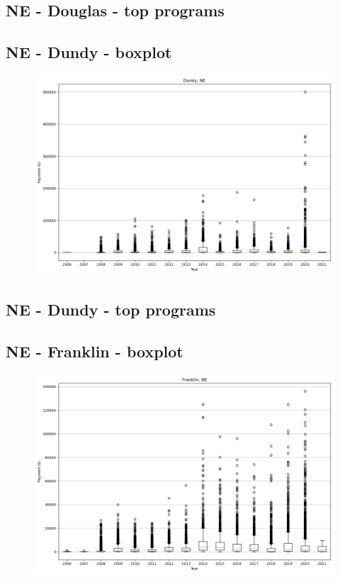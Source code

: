 \subsection*{NE - Douglas - top programs}

\newpage
\subsection*{NE - Dundy - boxplot}
\begin{figure}[h]
\centering
\includegraphics[width=7in]{../output/boxplots/counties/Dundy-NE_boxplot.png}
\end{figure}


\subsection*{NE - Dundy - top programs}

\newpage
\subsection*{NE - Franklin - boxplot}
\begin{figure}[h]
\centering
\includegraphics[width=7in]{../output/boxplots/counties/Franklin-NE_boxplot.png}
\end{figure}


